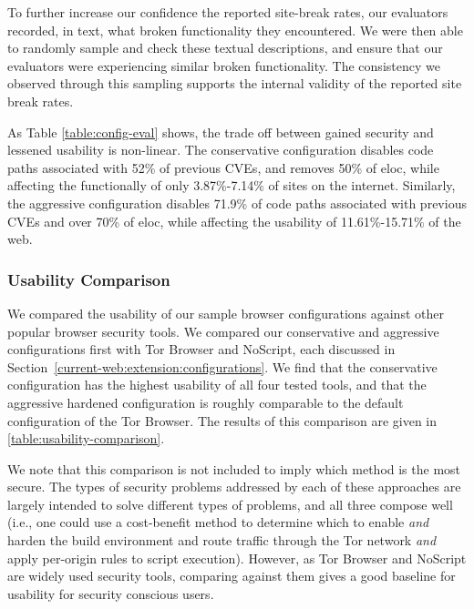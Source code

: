 To further increase our confidence the reported site-break rates, our evaluators
recorded, in text, what broken functionality they encountered.  We were then
able to randomly sample and check these textual
descriptions, and ensure that our evaluators were experiencing similar broken
functionality.  The consistency we observed through this sampling supports
the internal validity of the reported site break rates.

As Table \ref{table:config-eval} shows, the trade off between gained security
and lessened usability is non-linear.  The conservative configuration disables
code paths associated with 52\% of previous CVEs, and removes 50\% of
\gls{eloc}, while affecting the functionally of
only 3.87\%-7.14\% of sites on the internet.  Similarly, the aggressive
configuration disables 71.9\% of code paths associated with previous CVEs and
over 70\% of \gls{eloc}, while affecting the usability
of 11.61\%-15.71\% of the web.


\subsubsection{Usability Comparison}
\label{current-web:extension:usability-comparison}



We compared the usability of our sample browser configurations against
other popular browser security tools.  We compared our conservative and
aggressive configurations first with Tor Browser and NoScript, each discussed
in Section~\ref{current-web:extension:configurations}.  We find that the conservative
configuration has the highest usability of all four tested tools, and that
the aggressive hardened configuration is roughly comparable to the default
configuration of the Tor Browser.  The results of this comparison are given in
\ref{table:usability-comparison}.

We note that this comparison is not included to imply which method is the most
secure.  The types of security problems addressed by each of these approaches
are largely intended to solve different types of problems, and all three compose
well (i.e., one could use a cost-benefit method to determine which \WASs to enable
\textit{and} harden the build environment and route traffic through the Tor
network \textit{and} apply per-origin rules to script execution).  However, as
Tor Browser and NoScript are widely used security tools, comparing against them
gives a good baseline for usability for security conscious users.

